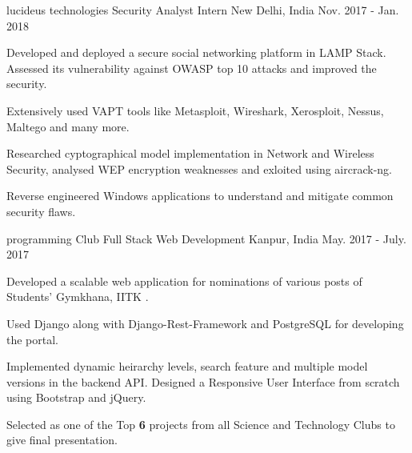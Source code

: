 


\begin{cventries}

  \cventry
    {lucideus technologies}
    {Security Analyst Intern}
    {New Delhi, India}
    {Nov. 2017 - Jan. 2018}
    {
      \begin{cvitems}
        \item Developed and deployed a secure social networking platform in LAMP Stack. Assessed its vulnerability against OWASP top 10 attacks and improved the security. 
        \item Extensively used VAPT tools like Metasploit, Wireshark, Xerosploit, Nessus, Maltego and many more.
        \item Researched cyptographical model implementation in Network and Wireless Security, analysed WEP encryption weaknesses and exloited using aircrack-ng.
        \item  Reverse engineered Windows applications to understand and mitigate common security flaws.  
      \end{cvitems}
    }

 \cventry
    {programming Club}
    {Full Stack Web Development}
    {Kanpur, India}
    {May. 2017 - July. 2017}
    {
      \begin{cvitems}
        \item Developed a scalable web application for nominations of various posts of Students' Gymkhana, IITK .
        \item Used Django along with Django-Rest-Framework and PostgreSQL for developing the portal.  
        \item	Implemented dynamic heirarchy levels, search feature and multiple model versions in the backend API. Designed a Responsive User Interface from scratch using Bootstrap and jQuery.
        \item Selected as one of the Top \textbf{6} projects from all Science and Technology Clubs to give final presentation.
      \end{cvitems}
    }
    

\end{cventries}
